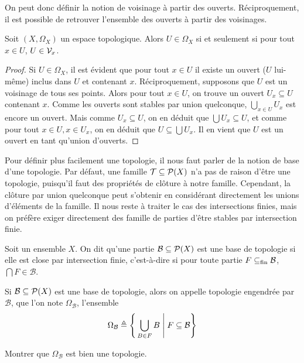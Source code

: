 On peut donc définir la notion de voisinage à partir des ouverts.
Réciproquement, il est possible de retrouver l'ensemble des ouverts à partir des
voisinages.

\begin{proposition}
  Soit $(X,\Omega_X)$ un espace topologique. Alors $U\in \Omega_X$ si et
  seulement si pour tout $x\in U$, $U\in\mathcal{V}_x$.
\end{proposition}

\begin{proof}
  Si $U\in \Omega_X$, il est évident que pour tout $x\in U$ il existe un ouvert
  ($U$ lui-même) inclus dans $U$ et contenant $x$. Réciproquement, supposons que
  $U$ est un voisinage de tous ses points. Alors pour tout $x\in U$, on trouve
  un ouvert $U_x\subseteq U$ contenant $x$. Comme les ouverts sont stables par
  union quelconque, $\displaystyle\bigcup_{x\in U} U_x$ est encore un ouvert.
  Mais comme $U_x\subseteq U$, on en déduit que $\bigcup U_x \subseteq U$, et
  comme pour tout $x\in U, x\in U_x$, on en déduit que $U\subseteq\bigcup U_x$.
  Il en vient que $U$ est un ouvert en tant qu'union d'ouverts.
\end{proof}

Pour définir plus facilement une topologie, il nous faut parler de la notion de
base d'une topologie. Par défaut, une famille $\mathcal T\subseteq\mathcal{P}(X)$
n'a pas de raison d'être une topologie, puisqu'il faut des propriétés de clôture
à notre famille. Cependant, la clôture par union quelconque peut s'obtenir en
considérant directement les unions d'éléments de la famille. Il nous reste à
traiter le cas des intersections finies, mais on préfère exiger directement des
famille de parties d'être stables par intersection finie.

\begin{definition}
  Soit un ensemble $X$. On dit qu'une partie $\mathcal B\subseteq\mathcal{P}(X)$
  est une base de topologie si elle est close par intersection finie,
  c'est-à-dire si pour toute partie $F\subseteq_{\mathrm{fin}}\mathcal B$,
  $\bigcap F \in\mathcal B$.

  Si $\mathcal B\subseteq\mathcal{P}(X)$ est une base de topologie, alors on
  appelle topologie engendrée par $\mathcal B$, que l'on note
  $\Omega_{\mathcal B}$, l'ensemble
  \[\Omega_{\mathcal B} \triangleq \Bigg\{\bigcup_{B \in F} B\;\Bigg|\;
  F\subseteq \mathcal B\Bigg\}\]
\end{definition}

\begin{exercise}
  Montrer que $\Omega_{\mathcal B}$ est bien une topologie.
\end{exercise}

